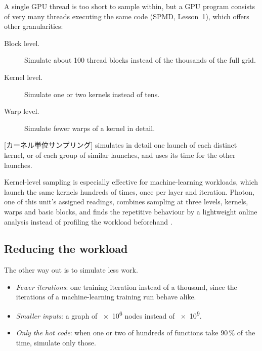 \documentclass[../main.tex]{subfiles}
\begin{document}
A single GPU thread is too short to sample within, but a GPU program
consists of very many threads executing the same code (SPMD, Lesson~1),
which offers other granularities:
\begin{description}
  \item[Block level.]  Simulate about 100 thread blocks instead of the
    thousands of the full grid.
  \item[Kernel level.]  Simulate one or two kernels instead of tens.
  \item[Warp level.]  Simulate fewer warps of a kernel in detail.
\end{description}

\begin{definition}
  \label{def:l08-kernel-sampling}
  [カーネル単位サンプリング] simulates in
  detail one launch of each distinct kernel, or of each group of
  similar launches, and uses its time for the other launches.
\end{definition}

Kernel-level sampling is especially effective for machine-learning
workloads, which launch the same kernels hundreds of times, once per
layer and iteration.  Photon, one of this unit's assigned readings,
combines sampling at three levels, kernels, warps and basic blocks, and
finds the repetitive behaviour by a lightweight online analysis instead
of profiling the workload beforehand \cite{liu2023photon}.

\subsection{Reducing the workload}

The other way out is to simulate less work.
\begin{itemize}
  \item \emph{Fewer iterations}: one training iteration instead of a
    thousand, since the iterations of a machine-learning training run
    behave alike.
  \item \emph{Smaller inputs}: a graph of \num{e6} nodes instead of
    \num{e9}.
  \item \emph{Only the hot code}: when one or two of hundreds of
    functions take 90\,\% of the time, simulate only those.
\end{itemize}
\end{document}
